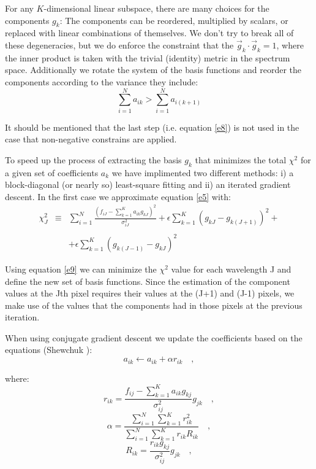 \documentclass[apj]{emulateapj}
\begin{document}
For any $K$-dimensional linear subspace, there are many choices for the components $g_k$: The components can be reordered, multiplied
by scalars, or replaced with linear combinations of themselves.  We don't try to break all of these degeneracies, but we do enforce the constraint that the $\vec{g}_k\cdot\vec{g}_k=1$, where the inner product is taken with the trivial (identity) metric in the spectrum space. Additionally we rotate the system of the basis functions and reorder the components according to the variance they include:
\begin{equation}\label{e8}
\sum_{i=1}^{N}a_{ik}>\sum_{i=1}^{N}a_{i(k+1)}
\end{equation}

It should be mentioned that the last step (i.e. equation \ref{e8}) is not used in the case that non-negative constrains are applied.

To speed up the process of extracting the basis $g_{k}$ that minimizes the total $\chi^2$ for a given set of coefficients $a_{k}$ we have implimented two different methods: i) a block-diagonal (or nearly so) least-square fitting and ii) an iterated gradient descent. In the first case we approximate equation \ref{e5} with:
\begin{equation}\label{e9}
\begin{array}{rcl}
\chi^2_{J} & \equiv & \sum_{i=1}^{N}\frac{(f_{iJ}-\sum_{k=1}^{K}a_{ik}g_{kJ})^2}{\sigma^2_{iJ}}+\epsilon\sum_{k=1}^{K}(g_{kJ}-g_{k(J+1)})^2+ \\
&&\\
 & & +\epsilon\sum_{k=1}^{K}(g_{k(J-1)}-g_{kJ})^2
\quad 
\end{array}
\end{equation}

Using equation \ref{e9} we can minimize the $\chi^2$ value for each wavelength J and define the new set of basis functions. Since the estimation of the component values at the Jth pixel requires their values at the (J+1) and (J-1) pixels, we make use of the values that the components had in those pixels at the previous iteration.

When using conjugate gradient descent we update the coefficients based on the equations (Shewchuk \citealt{shewchuk}):
\begin{equation}\label{e10}
a_{ik} \gets a_{ik}+\alpha r_{ik}
\quad ,
\end{equation}

where:
\begin{equation}\label{e11}
r_{ik}=\frac{f_{ij}-\sum_{k=1}^{K}a_{ik}g_{kj}}{\sigma^2_{ij}}g_{jk}
\quad ,
\end{equation}
\begin{equation}\label{e12}
\alpha=\frac{\sum_{i=1}^{N}\sum_{k=1}^{K}r^2_{ik}}{\sum_{i=1}^{N}\sum_{k=1}^{K}r_{ik}R_{ik}}
\quad ,
\end{equation}
\begin{equation}\label{e13}
R_{ik}=\frac{r_{ik}g_{kj}}{\sigma^2_{ij}}g_{jk}
\quad ,
\end{equation}
\end{document}
